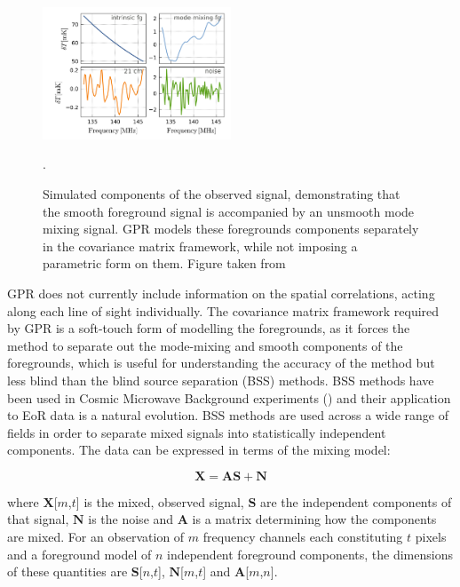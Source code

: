 \begin{figure}
\begin{center}
    \includegraphics[width=0.5\textwidth]{Images/mertens_components.png}
\end{center}
    \caption{Simulated components of the observed signal, demonstrating that the smooth foreground signal is accompanied by an unsmooth mode mixing signal. GPR models these foregrounds components separately in the covariance matrix framework, while not imposing a parametric form on them. Figure taken from \citet{Mertens2018MNRAS.478.3640M}}.
    \label{fig:mertens_comp}
\end{figure}

GPR does not currently include information on the spatial correlations, acting along each line of sight individually. The covariance matrix framework required by GPR is a soft-touch form of modelling the foregrounds, as it forces the method to separate out the mode-mixing and smooth components of the foregrounds, which is useful for understanding the accuracy of the method but less blind than the blind source separation (BSS) methods. BSS methods have been used in Cosmic Microwave Background experiments (\citet{PlanckI2018arXiv180706205P,PlanckIV2018arXiv180706208P}) and their application to EoR data is a natural evolution. BSS methods are used across a wide range of fields in order to separate mixed signals into statistically independent components. The data can be expressed in terms of the mixing model:

\begin{equation}
\mathbf{X} = \mathbf{A}\mathbf{S} + \mathbf{N}
\end{equation}

\noindent where $\mathbf{X}$[$m$,$t$] is the mixed, observed signal, $\mathbf{S}$ are the independent components of that signal, $\mathbf{N}$ is the noise and $\mathbf{A}$ is a matrix determining how the components are mixed. For an observation of $m$ frequency channels each constituting $t$ pixels and a foreground model of $n$ independent foreground components, the dimensions of these quantities are $\mathbf{S}$[$n$,$t$], $\mathbf{N}$[$m$,$t$] and $\mathbf{A}$[$m$,$n$].

